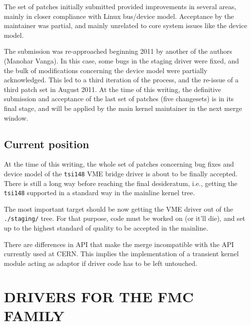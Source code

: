 \documentclass{JAC2003}
\begin{document}
The set of patches initially submitted provided improvements in several
areas, mainly in closer compliance with Linux bus/device model.
Acceptance by the maintainer was partial, and mainly unrelated to core
system issues like the device model.

The submission was re-approached beginning 2011 by another of the
authors (Manohar Vanga). In this case, some bugs in the staging driver
were fixed, and the bulk of modifications concerning the device model
were partially acknowledged. This led to a third iteration of the
process, and the re-issue of a third patch set in August 2011. At the
time of this writing, the definitive submission and acceptance of the
last set of patches (five changesets) is in its final stage, and
will be applied by the main kernel maintainer in the next merge window.

\subsection{Current position}

At the time of this writing, the whole set of patches concerning bug
fixes and device model of the \verb|tsi148| VME bridge driver is
about to be finally accepted. There is still a long way before reaching
the final desideratum, i.e., getting the \verb|tsi148|
supported in a standard way in the mainline kernel tree.
\begin{Itemize}
\item The most important target should be now getting the VME driver out
of the \verb|./staging/| tree. For that purpose, code must be worked on
(or it'll die), and set up to the highest standard of quality to be
accepted in the mainline.
\item There are differences in API that make the merge incompatible with
the API currently used at CERN. This implies the implementation of
a transient 
kernel module acting as adaptor if driver code has to be left untouched.
\end{Itemize}

\section{DRIVERS FOR THE FMC FAMILY}
\end{document}
